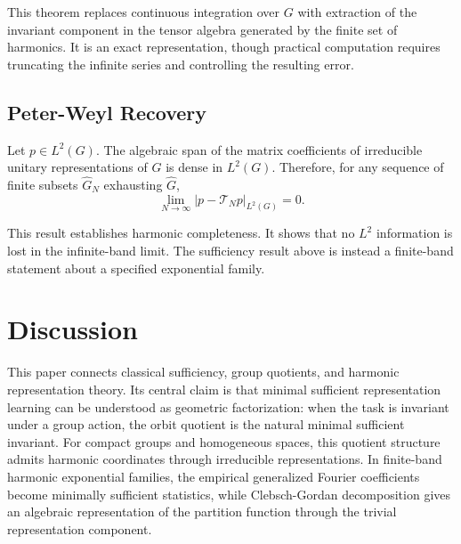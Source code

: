 \documentclass{ssl}
\begin{document}
This theorem replaces continuous integration over $G$ with extraction of the invariant component in the tensor algebra generated by the finite set of harmonics. It is an exact representation, though practical computation requires truncating the infinite series and controlling the resulting error.

\subsection{Peter-Weyl Recovery}

\begin{theorem}
Let $p\in L^2(G)$. The algebraic span of the matrix coefficients of irreducible unitary representations of $G$ is dense in $L^2(G)$. Therefore, for any sequence of finite subsets $\widehat G_N$ exhausting $\widehat G$,
$$
\lim_{N\to\infty}
|p-\mathcal T_Np|_{L^2(G)}
=
0.
$$
\end{theorem}

This result establishes harmonic completeness. It shows that no $L^2$ information is lost in the infinite-band limit. The sufficiency result above is instead a finite-band statement about a specified exponential family.

\section{Discussion}
This paper connects classical sufficiency, group quotients, and harmonic representation theory. Its central claim is that minimal sufficient representation learning can be understood as geometric factorization: when the task is invariant under a group action, the orbit quotient is the natural minimal sufficient invariant. For compact groups and homogeneous spaces, this quotient structure admits harmonic coordinates through irreducible representations. In finite-band harmonic exponential families, the empirical generalized Fourier coefficients become minimally sufficient statistics, while Clebsch-Gordan decomposition gives an algebraic representation of the partition function through the trivial representation component.



\end{document}
